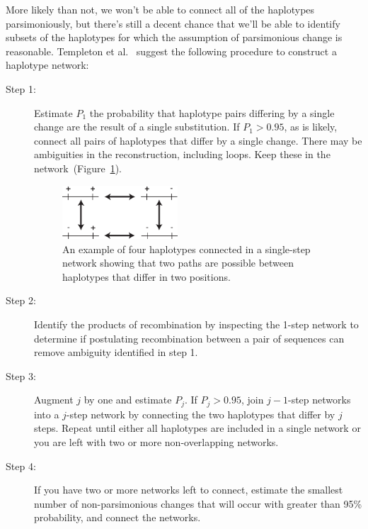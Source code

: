More likely than not, we won't be able to connect all of the
haplotypes parsimoniously, but there's still a decent chance that
we'll be able to identify subsets of the haplotypes for which the
assumption of parsimonious change is reasonable. Templeton et
al.~\cite{Templeton-etal-1992} suggest the following procedure to
construct a haplotype network:

\begin{description}

\item[Step 1:] Estimate $P_1$ the probability that haplotype pairs
  differing by a single change are the result of a single
  substitution. If $P_1 > 0.95$, as is likely, connect all pairs of
  haplotypes that differ by a single change. There may be ambiguities
  in the reconstruction, including loops. Keep these in the
  network~(Figure~\ref{fig:haplotype-network}).

\begin{figure}
\begin{center}
\includegraphics[width=0.425\textwidth]{haplotype-network.eps}
\end{center}
\caption{An example of four haplotypes connected in a single-step
  network showing that two paths are possible between haplotypes that
  differ in two positions.}\label{fig:haplotype-network}
\end{figure}


\item[Step 2:] Identify the products of recombination by inspecting
  the 1-step network to determine if postulating recombination between
  a pair of sequences can remove ambiguity identified in step 1.

\item[Step 3:] Augment $j$ by one and estimate $P_j$. If $P_j > 0.95$,
  join $j-1$-step networks into a $j$-step network by connecting
  the two haplotypes that differ by $j$ steps. Repeat until either all
  haplotypes are included in a single network or you are left with two
  or more non-overlapping networks.

\item[Step 4:] If you have two or more networks left to connect,
  estimate the smallest number of non-parsimonious changes that will
  occur with greater than 95\% probability, and connect the networks.

\end{description}

